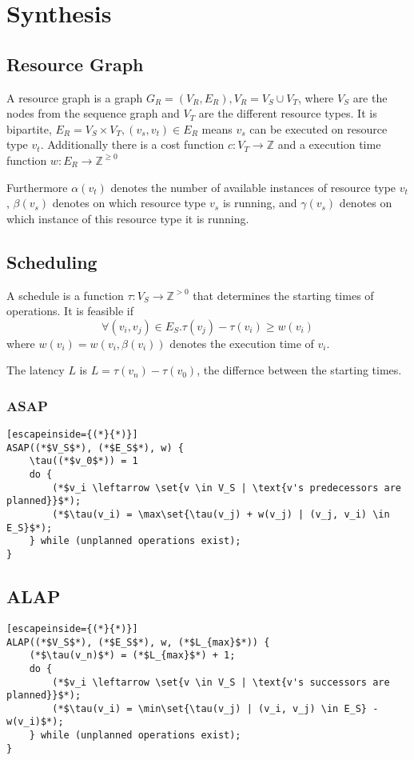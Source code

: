 \section{Synthesis}
\subsection{Resource Graph}
A resource graph is a graph $G_R = (V_R, E_R), V_R = V_S \cup V_T$, where
$V_S$ are the nodes from the sequence graph and $V_T$ are the different resource
types. It is bipartite, $E_R = V_S \times V_T, (v_s, v_t) \in E_R$ means $v_s$
can be executed on resource type $v_t$. Additionally there is a cost function
$c: V_T \to \mathbb{Z}$ and a execution time function $w: E_R \to \mathbb{Z}^{\geq 0}$

Furthermore $\alpha(v_t)$ denotes the number of available instances of resource
type $v_t$, $\beta(v_s)$ denotes on which resource type $v_s$ is running, and
$\gamma(v_s)$ denotes on which instance of this resource type it is running.

\subsection{Scheduling}
A schedule is a function $\tau: V_S \to \mathbb{Z}^{>0}$ that determines the
starting times of operations. It is feasible if
\begin{equation*}
	\forall (v_i, v_j) \in E_S . \tau(v_j) - \tau(v_i) \geq w(v_i)
\end{equation*}
where $w(v_i) = w(v_i, \beta(v_i))$ denotes the execution time of $v_i$.

The latency $L$ is $L = \tau(v_n) - \tau(v_0)$, the differnce between the
starting times.

\subsubsection{ASAP}
\begin{lstlisting}[escapeinside={(*}{*)}]
ASAP((*$V_S$*), (*$E_S$*), w) {
	\tau((*$v_0$*)) = 1
	do {
		(*$v_i \leftarrow \set{v \in V_S | \text{v's predecessors are planned}}$*);
		(*$\tau(v_i) = \max\set{\tau(v_j) + w(v_j) | (v_j, v_i) \in E_S}$*);
	} while (unplanned operations exist);
}
\end{lstlisting}

\subsection{ALAP}
\begin{lstlisting}[escapeinside={(*}{*)}]
ALAP((*$V_S$*), (*$E_S$*), w, (*$L_{max}$*)) {
	(*$\tau(v_n)$*) = (*$L_{max}$*) + 1;
	do {
		(*$v_i \leftarrow \set{v \in V_S | \text{v's successors are planned}}$*);
		(*$\tau(v_i) = \min\set{\tau(v_j) | (v_i, v_j) \in E_S} - w(v_i)$*);
	} while (unplanned operations exist);
}
\end{lstlisting}

